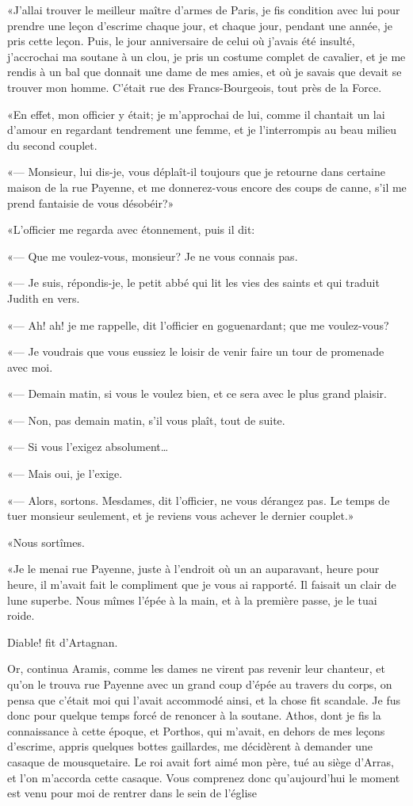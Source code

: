 «J'allai trouver le meilleur maître d'armes de Paris, je fis condition avec lui pour prendre une leçon d'escrime chaque jour, et chaque jour, pendant une année, je pris cette leçon. Puis, le jour anniversaire de celui où j'avais été insulté, j'accrochai ma soutane à un clou, je pris un costume complet de cavalier, et je me rendis à un bal que donnait une dame de mes amies, et où je savais que devait se trouver mon homme. C'était rue des Francs-Bourgeois, tout près de la Force. 

«En effet, mon officier y était; je m'approchai de lui, comme il chantait un lai d'amour en regardant tendrement une femme, et je l'interrompis au beau milieu du second couplet. 

«--- Monsieur, lui dis-je, vous déplaît-il toujours que je retourne dans certaine maison de la rue Payenne, et me donnerez-vous encore des coups de canne, s'il me prend fantaisie de vous désobéir?» 

«L'officier me regarda avec étonnement, puis il dit: 

«--- Que me voulez-vous, monsieur? Je ne vous connais pas. 

«--- Je suis, répondis-je, le petit abbé qui lit les vies des saints et qui traduit Judith en vers. 

«--- Ah! ah! je me rappelle, dit l'officier en goguenardant; que me voulez-vous? 

«--- Je voudrais que vous eussiez le loisir de venir faire un tour de promenade avec moi. 

«--- Demain matin, si vous le voulez bien, et ce sera avec le plus grand plaisir. 

«--- Non, pas demain matin, s'il vous plaît, tout de suite. 

«--- Si vous l'exigez absolument\dots 

«--- Mais oui, je l'exige. 

«--- Alors, sortons. Mesdames, dit l'officier, ne vous dérangez pas. Le temps de tuer monsieur seulement, et je reviens vous achever le dernier couplet.» 

«Nous sortîmes. 

«Je le menai rue Payenne, juste à l'endroit où un an auparavant, heure pour heure, il m'avait fait le compliment que je vous ai rapporté. Il faisait un clair de lune superbe. Nous mîmes l'épée à la main, et à la première passe, je le tuai roide. 

\speak  Diable! fit d'Artagnan. 

\speak  Or, continua Aramis, comme les dames ne virent pas revenir leur chanteur, et qu'on le trouva rue Payenne avec un grand coup d'épée au travers du corps, on pensa que c'était moi qui l'avait accommodé ainsi, et la chose fit scandale. Je fus donc pour quelque temps forcé de renoncer à la soutane. Athos, dont je fis la connaissance à cette époque, et Porthos, qui m'avait, en dehors de mes leçons d'escrime, appris quelques bottes gaillardes, me décidèrent à demander une casaque de mousquetaire. Le roi avait fort aimé mon père, tué au siège d'Arras, et l'on m'accorda cette casaque. Vous comprenez donc qu'aujourd'hui le moment est venu pour moi de rentrer dans le sein de l'église 

